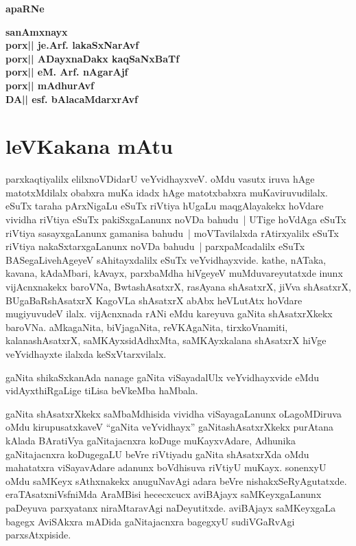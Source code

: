 \thispagestyle{empty}

\begin{center}
{\Large\bfseries apaRNe}
\end{center}
\bigskip

\begin{center}
{\bf sanAmxnayx\\
porx|| je.Arf. lakaSxNarAvf\\[4pt]
porx|| ADayxnaDakx kaqSaNxBaTf\\[4pt]
porx|| eM. Arf. nAgarAjf\\[4pt]
porx|| mAdhurAvf\\[4pt]
DA|| esf. bAlacaMdarxrAvf\\
}
\end{center}

\newpage

\chapter*{leVKakana mAtu}

parxkaqtiyalilx elilxnoVDidarU veYvidhayxveV. oMdu vasutx iruva hAge matotxMdilalx obabxra\- muKa idadx hAge matotxbabxra muKaviruvudilalx. eSuTx taraha pArxNigaLu eSuTx\- riVtiya hUgaLu maqgAlayakekx hoVdare vividha riVtiya eSuTx pakiSxgaLanunx noVDa bahudu~| UTige hoVdAga eSuTx riVtiya sasayxgaLanunx gamanisa bahudu~| moVTavilalxda rAtirx\-yalilx eSuTx riVtiya nakaSxtarxgaLanunx noVDa bahudu~| parxpaMcadalilx eSuTx BASegaLive\break hAgeyeV sAhitayxdalilx eSuTx veYvidhayxvide. kathe, nATaka, kavana, kAdaMbari, kAvayx, parxbaMdha hiVgeyeV muMduvareyutatxde inunx vijAcnxnakekx baroVNa, BwtashAsatxrX, rasAyana shAsatxrX, jiVva shAsatxrX, BUgaBaRshAsatxrX KagoVLa shAsatxrX abAbx heVLutAtx hoVdare mugiyuvudeV ilalx. \-vijAcnxnada rANi eMdu kareyuva gaNita shAsatxrXkekx baroVNa. aMkagaNita, biVjagaNita,\- reVKAgaNita, tirxkoVnamiti, kalanashAsatxrX, saMKAyxsidAdhxMta, saMKAyxkalana shAsatxrX hiVge \-veYvidhayxte ilalxda keSxVtarxvilalx.

gaNita shikaSxkanAda nanage gaNita viSayadalUlx veYvidhayxvide eMdu vidAyxthiRgaLige tiLisa beVkeMba haMbala.

gaNita shAsatxrXkekx saMbaMdhisida vividha viSayagaLanunx oLagoMDiruva oMdu kirupusatxkaveV ``gaNita veYvidhayx'' gaNitashAsatxrXkekx purAtana kAlada BAratiVya gaNitajacnxra koDuge muKayxvAdare, Adhunika gaNitajacnxra koDugegaLU beVre riVtiyadu gaNita shAsatxrXda oMdu mahatatxra viSayavAdare adanunx boVdhisuva riVtiyU muKayx. sonenxyU oMdu saMKeyx sAthxnakekx anuguNavAgi adara beVre nishakxSeRyAgutatxde. eraTAsatxniVsfniMda AraMBisi
hececxcucx aviBAjayx saMKeyxgaLanunx paDeyuva parxyatanx niraMtaravAgi naDeyu\-titxde. aviBAjayx saMKeyxgaLa bagegx AviSAkxra mADida gaNitajacnxra bagegxyU sudiVGaRvAgi parxsAtxpiside.

